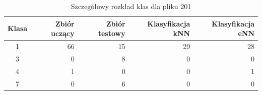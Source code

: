 \begin{table}[H]
	\centering
	\begin{tabular}{|c|r|r|r|r|}
		\hline
		
		Klasa & Zbiór uczący & Zbiór testowy & Klasyfikacja kNN & Klasyfikacja eNN \\
		\hline
		1 & 66 & 15 & 29 & 28 \\
		\hline 
		3 & 0 & 8 & 0 & 0 \\
		\hline
		4 & 1 & 0 & 0 & 1 \\
		\hline
		7 & 0 & 6 & 0 & 0 \\
		\hline
		
	\end{tabular}
	\caption{Szczegółowy rozkład klas dla pliku 201}
	\label{tab:matlab-plik201}
\end{table}



